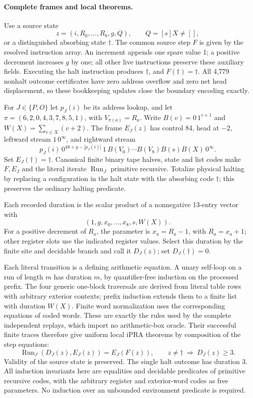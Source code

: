 \paragraph{Complete frames and local theorems.}
Use a source state
\[
 z=(i,R_0,\ldots,R_8,g,Q),\qquad Q=[s]X\ne[],
\]
or
a distinguished absorbing state $\dagger$.  The common source step
$F$ is given by the resolved instruction array.  An increment appends
one spare value 1; a positive decrement increases $g$ by one; all
other live instructions preserve these auxiliary fields.  Executing
the halt instruction produces $\dagger$, and
$F(\dagger)=\dagger$.  All 4,779 nonhalt outcome certificates have
zero address overflow and zero net head displacement, so these
bookkeeping updates close the boundary encoding exactly.

For $J\in\{P,O\}$ let $p_J(i)$ be its address lookup, and let
$\pi=(6,2,0,4,3,7,8,5,1)$, with $V_{\pi(a)}=R_a$.  Write
$B(v)=0\,1^{v+1}$ and $W(X)=\sum_{v\in X}(v+2)$.  The frame $E_J(z)$
has control 84, head at $-2$, leftward stream $1\,0^\infty$, and
rightward stream
\[
 p_J(i)\,0^{48+g-|p_J(i)|}\,1\,
 B(V_0)\cdots B(V_8)B(s)B(X)\,0^\infty.
 \tag{S2}
\]
Set $E_J(\dagger)=\dagger$.  Canonical finite binary tape halves,
state and list codes make $F,E_J$ and the literal iterate
$\operatorname{Run}_J$ primitive recursive.  Totalize physical halting
by replacing a configuration in the halt state with the absorbing
code $\dagger$; this preserves the ordinary halting predicate.

Each recorded duration is the scalar product of a nonnegative
13-entry vector with
\[
 (1,g,x_0,\ldots,x_8,s,W(X)).
\]
For a positive decrement of $R_a$,
the parameter is $x_a=R_a-1$, with $R_a=x_a+1$; other register slots
use the indicated register values.  Select this duration by the
finite site and decidable branch and call it $D_J(z)$; set
$D_J(\dagger)=0$.

Each literal transition is a defining arithmetic equation.  A unary
self-loop on a run of length $m$ has duration $m$, by quantifier-free
induction on the processed prefix.  The four generic one-block
traversals are derived from literal table rows with arbitrary exterior
contexts; prefix induction extends them to a finite list with duration
$W(X)$.  Finite word normalization uses the corresponding equations
of coded words.  These are exactly the rules used by the complete
independent replays, which import no arithmetic-box oracle.  Their
successful finite traces therefore give uniform local iPRA theorems
by composition of the step equations:
\[
 \operatorname{Run}_J(D_J(z),E_J(z))=E_J(F(z)),\qquad
 z\ne\dagger\ \Longrightarrow\ D_J(z)\ge3.
 \tag{S3}
\]
Validity of the source state is preserved.  The single halt outcome
has duration 3.  All induction invariants here are equalities and
decidable predicates of primitive recursive codes, with the arbitrary
register and exterior-word codes as free parameters.  No induction
over an unbounded environment predicate is required.

